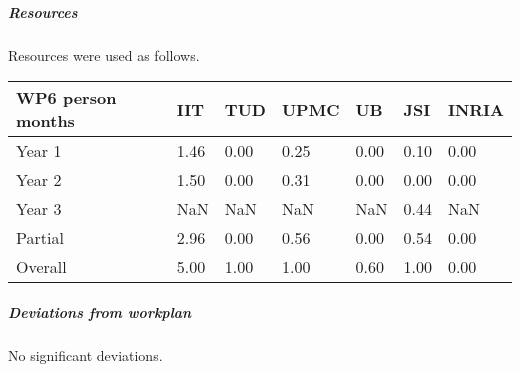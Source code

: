 

\subparagraph{Resources}

Resources were used as follows.

\begin{center}
\begin{tabular}{|C{1.5cm}|C{1.5cm}|C{1.5cm}|C{2cm}|C{2cm}|C{2cm}|C{2cm}|}
\hline
\footnotesize \textbf{WP6 person months}& \footnotesize \textbf{IIT}&\footnotesize \textbf{TUD}&\footnotesize \textbf{UPMC}& \footnotesize \textbf{UB} &\footnotesize \textbf{JSI} & \footnotesize \textbf{INRIA} \\ \hline
\footnotesize Year 1 &  1.46 & 0.00 & 0.25 & 0.00 & 0.10 & 0.00    \\  \hline
\footnotesize Year 2 &  1.50 & 0.00 & 0.31 & 0.00 & 0.00 & 0.00     \\  \hline
\footnotesize Year 3 &  NaN & NaN & NaN & NaN & 0.44 & NaN     \\  \hline
\footnotesize Partial &  2.96 & 0.00 & 0.56 & 0.00 & 0.54 & 0.00 \\ \hline \hline
\footnotesize Overall &  5.00 & 1.00 & 1.00 & 0.60 & 1.00 & 0.00 \\ \hline
\end{tabular}
\end{center}

\subparagraph{Deviations from workplan} 
No significant deviations. 
